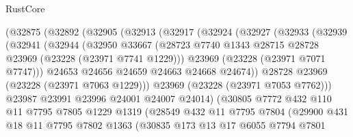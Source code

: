 \begin{lexlean}{RustCore}
\begin{coremodule}
              (@32875
                (@32892
                  (@32905
                    (@32913
                      (@32917
                        (@32924
                          (@32927
                            (@32933
                              (@32939
                                (@32941
                                  (@32944
                                    (@32950
                                      @33667
                                      (@28723
                                        @7740
                                        @1343
                                        @28715
                                        @28728
                                        @23969
                                        (@23228 (@23971 @7741 @1229)))
                                      @23969
                                      (@23228 (@23971 @7071 @7747)))
                                    @24653
                                    @24656
                                    @24659
                                    @24663
                                    @24668
                                    @24674))
                                @28728
                                @23969
                                (@23228 (@23971 @7063 @1229)))
                              @23969
                              (@23228 (@23971 @7053 @7762)))
                            @23987
                            @23991
                            @23996
                            @24001
                            @24007
                            @24014)
                          (@30805
                            @7772
                            @432
                            @110
                            @11
                            @7795
                            @7805
                            @1229
                            @1319
                            (@28549
                              @432
                              @11
                              @7795
                              @7804
                              (@29900
                                @431
                                @18
                                @11
                                @7795
                                @7802
                                @1363
                                (@30835
                                  @173
                                  @13
                                  @17
                                  @6055
                                  @7794
                                  @7801

\end{coremodule}
\end{lexlean}
